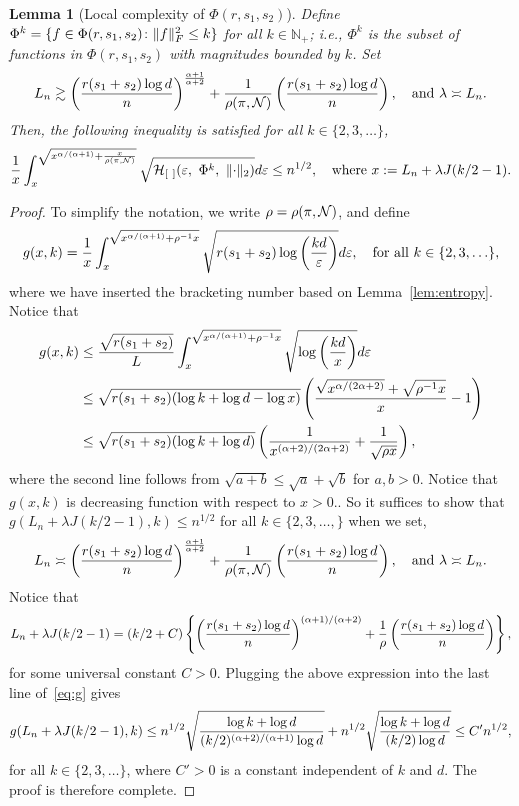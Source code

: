 \documentclass[11pt]{article}
\theoremstyle{plain}
\newtheorem{lem}{Lemma}
\theoremstyle{definition}
\begin{document}
\begin{lem}[Local complexity of $\Phi(r,s_1,s_2)$] \label{lem:metric}
Define $\Phi^{k}=\{f\in\Phi(r,s_1,s_2)\colon \lVert f\rVert_F^2\leq k\}$ for all $k\in\mathbb{N}_{+}$; i.e., $\Phi^k$ is the subset of functions in $\Phi(r,s_1,s_2)$ with magnitudes bounded by $k$. Set 
\begin{equation}\label{eq:specification}
L_n\gtrsim \left({r(s_1+s_2)\log d \over n } \right)^{\alpha+1\over \alpha+2} + {1\over \rho (\pi, \tN)}\left({r(s_1+s_2)\log d \over n } \right),\quad \text{and}\ 
\lambda \asymp {L_n}.
\end{equation}
Then, the following inequality is satisfied for all $k\in\{2,3,\ldots\}$,
\begin{equation}
{1\over x}\int^{\sqrt{x^{\alpha/(\alpha+1)}+{x\over \rho (\pi, \mathcal{N})}}}_{x} \sqrt{\mathcal{H}_{[\ ]}(\varepsilon,\ \Phi^{k},\ \lVert\cdot\rVert_2) }d\varepsilon \leq n^{1/2}, \quad \text{where}\ x:=L_n+\lambda J(k/2-1).
\end{equation}
\end{lem}
\begin{proof}
To simplify the notation, we write $\rho=\rho(\pi, \mathcal{N})$, and define
\begin{equation}\label{eq:complexity}
g(x, k)={1\over x}\int^{\sqrt{x^{\alpha/(\alpha+1)}+\rho^{-1}x}}_{x} \sqrt{r(s_1+s_2)\log\left({kd\over \varepsilon}\right)}d\varepsilon,\quad \text{for all }k\in\{2,3,\ldots\},
\end{equation}
where we have inserted the bracketing number based on Lemma~\ref{lem:entropy}.  Notice that
\begin{align}\label{eq:g}
g(x,k)&\leq {\sqrt{r(s_1+s_2)}\over L}\int_{x}^{\sqrt{x^{\alpha/(\alpha+1)}+\rho^{-1}x}}\sqrt{\log \left(kd \over x \right)}d\varepsilon\notag \\
&\leq \sqrt{r(s_1+s_2)(\log k+\log d - \log x)}\left({\sqrt{x^{\alpha/(2\alpha+2)}}+\sqrt{\rho^{-1}x} \over x }-1\right)\notag \\
&\leq  \sqrt{r(s_1+s_2)(\log k+\log d)}\left( {1\over x^{(\alpha+2)/(2\alpha+2)}}+{1\over \sqrt{\rho x}}\right),
\end{align}
where the second line follows from $\sqrt{a+b} \leq \sqrt{a}+\sqrt{b}$ for $a,b>0$.   Notice that $g(x,k)$ is decreasing function with respect to $x>0.$. So it suffices to show that $g(L_n+\lambda J(k/2-1), k) \leq n^{1/2}$ for all $k\in\{2,3,\ldots,\}$ when we set,
\[
L_n\asymp \left({r(s_1+s_2)\log d \over n } \right)^{\alpha+1\over \alpha+2} + {1\over \rho (\pi, \tN)}\left({r(s_1+s_2)\log d \over n } \right),\quad \text{and}\ 
\lambda \asymp {L_n}.
\]
 Notice that 
\[
L_n+\lambda J(k/2-1)=(k/2+C)\left\{\left( {r(s_1+s_2)\log d \over n}\right)^{(\alpha+1)/(\alpha+2)}+{1\over \rho}\left( {r(s_1+s_2)\log d \over n}\right)\right\},
\]
for some universal constant $C>0$. Plugging the above expression into the last line of~\eqref{eq:g} gives
\[
g(L_n+\lambda J(k/2-1),k)\leq n^{1/2}\sqrt{\log k+\log d\over (k/2)^{(\alpha+2)/(\alpha+1)} \log d}+n^{1/2}\sqrt{\log k+\log d \over (k/2) \log d }\leq C'n^{1/2},
\]
for all $k\in\{2,3,\ldots\}$, where $C'>0$ is a constant independent of $k$ and $d$. The proof is therefore complete. 
\end{proof}
\end{document}
